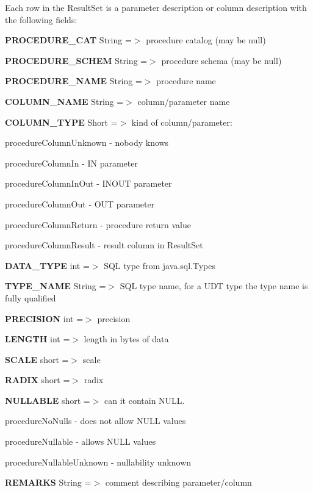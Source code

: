 Each row in the {\ttfamily Result\+Set} is a parameter description or column description with the following fields\+: 
\begin{DoxyEnumerate}
\item {\bfseries P\+R\+O\+C\+E\+D\+U\+R\+E\+\_\+\+C\+AT} String =$>$ procedure catalog (may be {\ttfamily null}) 
\item {\bfseries P\+R\+O\+C\+E\+D\+U\+R\+E\+\_\+\+S\+C\+H\+EM} String =$>$ procedure schema (may be {\ttfamily null}) 
\item {\bfseries P\+R\+O\+C\+E\+D\+U\+R\+E\+\_\+\+N\+A\+ME} String =$>$ procedure name 
\item {\bfseries C\+O\+L\+U\+M\+N\+\_\+\+N\+A\+ME} String =$>$ column/parameter name 
\item {\bfseries C\+O\+L\+U\+M\+N\+\_\+\+T\+Y\+PE} Short =$>$ kind of column/parameter\+: 
\begin{DoxyItemize}
\item procedure\+Column\+Unknown -\/ nobody knows 
\item procedure\+Column\+In -\/ IN parameter 
\item procedure\+Column\+In\+Out -\/ I\+N\+O\+UT parameter 
\item procedure\+Column\+Out -\/ O\+UT parameter 
\item procedure\+Column\+Return -\/ procedure return value 
\item procedure\+Column\+Result -\/ result column in {\ttfamily Result\+Set} 
\end{DoxyItemize}
\item {\bfseries D\+A\+T\+A\+\_\+\+T\+Y\+PE} int =$>$ S\+QL type from java.\+sql.\+Types 
\item {\bfseries T\+Y\+P\+E\+\_\+\+N\+A\+ME} String =$>$ S\+QL type name, for a U\+DT type the type name is fully qualified 
\item {\bfseries P\+R\+E\+C\+I\+S\+I\+ON} int =$>$ precision 
\item {\bfseries L\+E\+N\+G\+TH} int =$>$ length in bytes of data 
\item {\bfseries S\+C\+A\+LE} short =$>$ scale 
\item {\bfseries R\+A\+D\+IX} short =$>$ radix 
\item {\bfseries N\+U\+L\+L\+A\+B\+LE} short =$>$ can it contain N\+U\+LL. 
\begin{DoxyItemize}
\item procedure\+No\+Nulls -\/ does not allow N\+U\+LL values 
\item procedure\+Nullable -\/ allows N\+U\+LL values 
\item procedure\+Nullable\+Unknown -\/ nullability unknown 
\end{DoxyItemize}
\item {\bfseries R\+E\+M\+A\+R\+KS} String =$>$ comment describing parameter/column 
\end{DoxyEnumerate}

